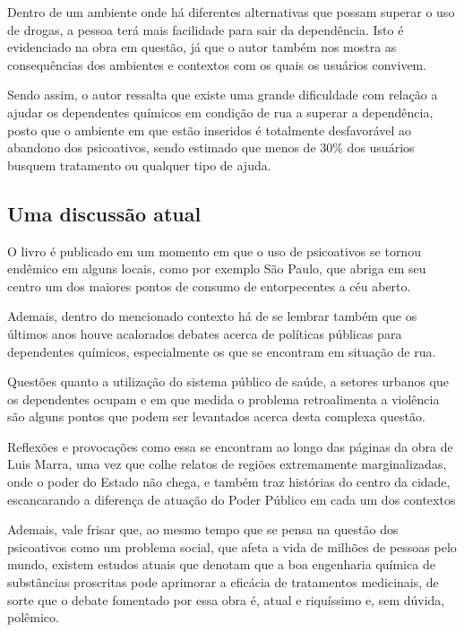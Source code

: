 \documentclass[12pt]{extarticle}
\begin{document}
Dentro de um ambiente onde há diferentes alternativas que possam superar
o uso de drogas, a pessoa terá mais facilidade para sair da dependência.
Isto é evidenciado na obra em questão, já que o autor também nos mostra
as consequências dos ambientes e contextos com os quais os usuários
convivem.

Sendo assim, o autor ressalta que existe uma grande dificuldade com
relação a ajudar os dependentes químicos em condição de rua a superar a
dependência, posto que o ambiente em que estão inseridos é totalmente
desfavorável ao abandono dos psicoativos, sendo estimado que menos de
30\% dos usuários busquem tratamento ou qualquer tipo de ajuda.

\subsection{Uma discussão atual}

O livro é publicado em um momento em que o uso de psicoativos se tornou
endêmico em alguns locais, como por exemplo São Paulo, que abriga em seu
centro um dos maiores pontos de consumo de entorpecentes a céu aberto.


Ademais, dentro do mencionado contexto há de se lembrar também que os
últimos anos houve acalorados debates acerca de políticas públicas para
dependentes químicos, especialmente os que se encontram em situação de
rua.

Questões quanto a utilização do sistema público de saúde, a setores
urbanos que os dependentes ocupam e em que medida o problema
retroalimenta a violência são alguns pontos que podem ser levantados
acerca desta complexa questão.

Reflexões e provocações como essa se encontram ao longo das páginas da
obra de Luis Marra, uma vez que colhe relatos de regiões extremamente
marginalizadas, onde o poder do Estado não chega, e também traz
histórias do centro da cidade, escancarando a diferença de atuação do
Poder Público em cada um dos contextos

Ademais, vale frisar que, ao mesmo tempo que se pensa na questão dos
psicoativos como um problema social, que afeta a vida de milhões de
pessoas pelo mundo, existem estudos atuais que denotam que a boa
engenharia química de substâncias proscritas pode aprimorar a eficácia
de tratamentos medicinais, de sorte que o debate fomentado por essa obra
é, atual e riquíssimo e, sem dúvida, polêmico.
\end{document}
